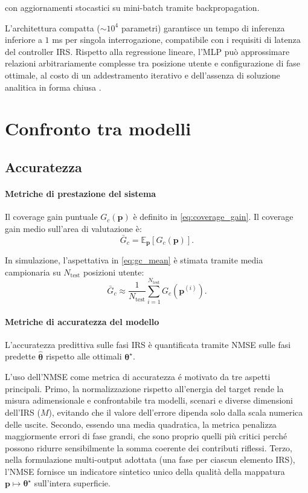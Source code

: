 \documentclass[12pt,a4paper]{report}
\begin{document}
con aggiornamenti stocastici su mini-batch tramite backpropagation.

\noindent L'architettura compatta ($\sim 10^4$ parametri) garantisce
un tempo di inferenza inferiore a $1$ ms per singola interrogazione,
compatibile con i requisiti di latenza del controller IRS. Rispetto
alla regressione lineare, l'MLP può approssimare relazioni
arbitrariamente complesse tra posizione utente e configurazione di
fase ottimale, al costo di un addestramento iterativo e dell'assenza
di soluzione analitica in forma chiusa \cite{goodfellow2016dl}.

\section{Confronto tra modelli}
\subsection{Accuratezza}
\paragraph{Metriche di prestazione del sistema}
Il coverage gain puntuale $G_c(\mathbf{p})$ \`e definito in
\eqref{eq:coverage_gain}. Il coverage gain medio sull'area di valutazione \`e:
\begin{equation}
  \bar{G}_c = \mathbb{E}_{\mathbf{p}}\left[G_c(\mathbf{p})\right].
  \label{eq:gc_mean}
\end{equation}

In simulazione, l'aspettativa in \eqref{eq:gc_mean} \`e stimata
tramite media campionaria su $N_{\text{test}}$ posizioni utente:
\begin{equation}
  \bar{G}_c \approx \frac{1}{N_{\text{test}}}
  \sum_{i=1}^{N_{\text{test}}} G_c\!\left(\mathbf{p}^{(i)}\right).
  \label{eq:gc_mean_empirical}
\end{equation}

\paragraph{Metriche di accuratezza del modello}
L'accuratezza predittiva sulle fasi IRS \`e quantificata tramite NMSE
sulle fasi predette $\hat{\boldsymbol{\theta}}$ rispetto alle
ottimali $\boldsymbol{\theta}^\star$.

L'uso dell'NMSE come metrica di accuratezza \'e motivato da tre
aspetti principali. Primo, la normalizzazione rispetto all'energia
del target rende la misura adimensionale e confrontabile tra modelli,
scenari e diverse dimensioni dell'IRS ($M$), evitando che il valore
dell'errore dipenda solo dalla scala numerica delle uscite. Secondo,
essendo una media quadratica, la metrica penalizza maggiormente
errori di fase grandi, che sono proprio quelli pi\`u critici perch\'e
possono ridurre sensibilmente la somma coerente dei contributi
riflessi. Terzo, nella formulazione multi-output adottata (una fase
per ciascun elemento IRS), l'NMSE fornisce un indicatore sintetico
unico della qualit\`a della mappatura $\mathbf{p} \mapsto
\boldsymbol{\theta}^\star$ sull'intera superficie.
\end{document}
